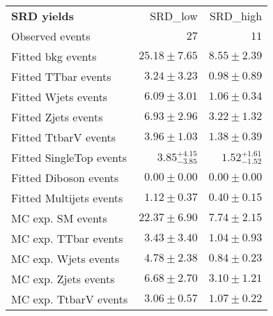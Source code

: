 

\begin{table}
\begin{center}
\setlength{\tabcolsep}{0.0pc}
{\small
\begin{tabular*}{\textwidth}{@{\extracolsep{\fill}}lrr}
\noalign{\smallskip}\hline\noalign{\smallskip}
{\bf SRD yields}           & SRD\_low            & SRD\_high              \\[-0.05cm]
\noalign{\smallskip}\hline\noalign{\smallskip}
Observed events          & $27$              & $11$                    \\
\noalign{\smallskip}\hline\noalign{\smallskip}
Fitted bkg events         & $25.18 \pm 7.65$          & $8.55 \pm 2.39$              \\
\noalign{\smallskip}\hline\noalign{\smallskip}
        Fitted TTbar events         & $3.24 \pm 3.23$          & $0.98 \pm 0.89$              \\
        Fitted Wjets events         & $6.09 \pm 3.01$          & $1.06 \pm 0.34$              \\
        Fitted Zjets events         & $6.93 \pm 2.96$          & $3.22 \pm 1.32$              \\
        Fitted TtbarV events         & $3.96 \pm 1.03$          & $1.38 \pm 0.39$              \\
        Fitted SingleTop events         & $3.85_{-3.85}^{+4.15}$          & $1.52_{-1.52}^{+1.61}$              \\
        Fitted Diboson events         & $0.00 \pm 0.00$          & $0.00 \pm 0.00$              \\
        Fitted Multijets events         & $1.12 \pm 0.37$          & $0.40 \pm 0.15$              \\
 \noalign{\smallskip}\hline\noalign{\smallskip}
MC exp. SM events              & $22.37 \pm 6.90$          & $7.74 \pm 2.15$              \\
\noalign{\smallskip}\hline\noalign{\smallskip}
        MC exp. TTbar events         & $3.43 \pm 3.40$          & $1.04 \pm 0.93$              \\
        MC exp. Wjets events         & $4.78 \pm 2.38$          & $0.84 \pm 0.23$              \\
        MC exp. Zjets events         & $6.68 \pm 2.70$          & $3.10 \pm 1.21$              \\
        MC exp. TtbarV events         & $3.06 \pm 0.57$          & $1.07 \pm 0.22$              \\

\end{tabular*}}
\end{center}
\end{table}
